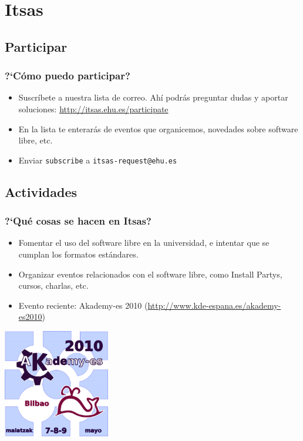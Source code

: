 \documentclass[xcolor=dvipsnames]{beamer}    %
\begin{document}
\section{Itsas}
\subsection{Participar}
\begin{frame}
 \frametitle{?`C\'omo puedo participar?}
 \begin{itemize}
\item Suscr\'ibete a nuestra lista de correo. Ah\'i podr\'as preguntar dudas y
aportar soluciones: \url{http://itsas.ehu.es/participate}
\item En la lista te enterar\'as de eventos que organicemos, novedades sobre
software libre, etc.
\item Enviar \texttt{subscribe} a \texttt{itsas-request@ehu.es}
\end{itemize}
\end{frame}

\subsection{Actividades}
\begin{frame}
 \frametitle{?`Qu\'e cosas se hacen en Itsas?}
 \begin{itemize}
\item Fomentar el uso del software libre en la universidad, e intentar que se
cumplan los formatos est\'andares. 
\item Organizar eventos relacionados con el software libre, como Install
Partys, cursos, charlas, etc. 
\item Evento reciente: Akademy-es 2010
(\url{http://www.kde-espana.es/akademy-es2010})
\end{itemize}
 \begin{center}
\includegraphics[width=0.35\textwidth]{./Utils/akademyes2010.png}  
\end{center} 

\end{frame}
\end{document}
